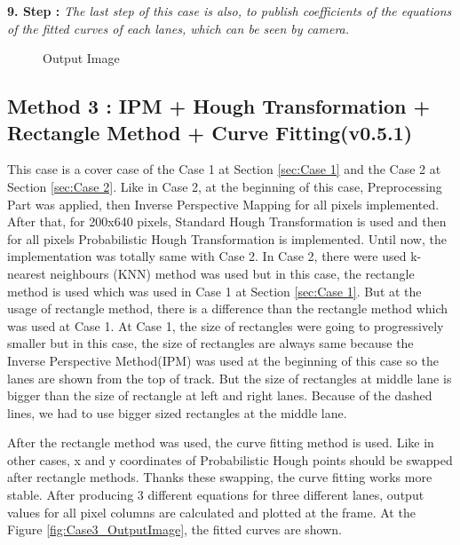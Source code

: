 \textbf{9. Step : }\emph{\color{blue}The last step of this case is also, to publish coefficients of the equations of the fitted curves of each lanes, which can be seen by camera.}


\begin{figure}[H]
  \centering
  \caption{Output Image}
\end{figure} 


\subsection{Method 3 : IPM + Hough Transformation + Rectangle Method + Curve Fitting(v0.5.1)}\label{sec:Case 3}

This case is a cover case of the Case 1 at Section \ref{sec:Case 1} and the Case 2 at Section \ref{sec:Case 2}. Like in Case 2, at the beginning of this case, Preprocessing Part was applied, then Inverse Perspective Mapping for all pixels implemented. After that, for 200x640 pixels, Standard Hough Transformation is used and then for all pixels Probabilistic Hough Transformation is implemented. Until now, the implementation was totally same with Case 2. In Case 2, there were used k-nearest neighbours (KNN) method was used but in this case, the rectangle method is used which was used in Case 1 at Section \ref{sec:Case 1}. But at the usage of rectangle method, there is a difference than the rectangle method which was used at Case 1. At Case 1, the size of rectangles were going to progressively smaller but in this case, the size of rectangles are always same because the Inverse Perspective Method(IPM) was used at the beginning of this case so the lanes are shown from the top of track. But the size of rectangles at middle lane is bigger than the size of rectangle at left and right lanes. Because of the dashed lines, we had to use bigger sized rectangles at the middle lane.

After the rectangle method was used,  the curve fitting method is used. Like in other cases, x and y coordinates of Probabilistic Hough points should be swapped after rectangle methods. Thanks these swapping, the curve fitting works more stable. After producing 3 different equations for three different lanes, output values for all pixel columns are calculated and plotted at the frame. At the Figure \ref{fig:Case3_OutputImage}, the fitted curves are shown.

